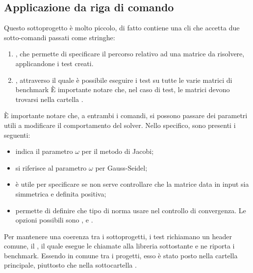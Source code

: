 \subsection{Applicazione da riga di comando} \label{sec:cli}
Questo sottoprogetto è molto piccolo, di fatto contiene una cli che accetta due sotto-comandi passati come stringhe:

\begin{enumerate}
	\item {}, che permette di specificare il percorso relativo ad una matrice da risolvere, applicandone i test creati.
	\item {}, attraverso il quale è possibile eseguire i test su tutte le varie matrici di benchmark È importante notare che, nel caso di test, le matrici devono trovarsi nella cartella .
\end{enumerate}

È importante notare che, a entrambi i comandi, si possono passare dei parametri utili a modificare il comportamento del solver. Nello specifico, sono presenti i seguenti:

\begin{itemize}
	\item {} indica il parametro $\omega$ per il metodo di Jacobi;
	\item {} si riferisce al parametro $\omega$ per Gauss-Seidel;
	\item {} è utile per specificare se non serve controllare che la matrice data in input sia simmetrica e definita positiva;
	\item {} permette di definire che tipo di norma usare nel controllo di convergenza. Le opzioni possibili sono ,  e .
\end{itemize}

Per mantenere una coerenza tra i sottoprogetti, i test richiamano un header comune, il , il quale esegue le chiamate alla libreria sottostante e ne riporta i benchmark. Essendo in comune tra i progetti, esso è stato posto nella cartella principale, piuttosto che nella sottocartella .


